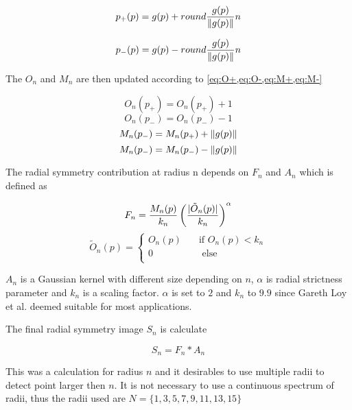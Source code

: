 \begin{equation} \label{eq:p+}
p_{+}(p) = g(p) + round\frac{g(p)}{\lVert g(p)\rVert}n
\end{equation}

\begin{equation} \label{eq:p-}
p_{-}(p) = g(p) - round\frac{g(p)}{\lVert g(p)\rVert}n
\end{equation}

The $O_n$ and $M_n$ are then updated according to \cref{eq:O+,eq:O-,eq:M+,eq:M-}

\begin{equation} \label{eq:O+}
O_{n}(p_{+}) = O_{n}(p_{+}) + 1
\end{equation}
\begin{equation} \label{eq:O-}
O_{n}(p_{-}) = O_{n}(p_{-}) - 1
\end{equation}
\begin{equation} \label{eq:M+}
M_{n}(p_{-}) = M_{n}(p_{+}) + \lVert g(p)\rVert
\end{equation}
\begin{equation} \label{eq:M-}
M_{n}(p_{-}) = M_{n}(p_{-}) - \lVert g(p)\rVert
\end{equation}

The radial symmetry contribution at radius n depends on $F_n$ and $A_n$ which is defined as 

\begin{equation} \label{eq:F}
F_n = \frac{M_{n}(p)}{k_n} \left(\frac{\lvert\tilde{O}_n(p)\rvert}{k_n}\right)^{\alpha}
\end{equation}
\begin{equation} \label{eq:A}
 \tilde{O}_n(p) =   
 \begin{cases}
 O_n(p)    & \quad \text{if } O_n(p) < k_n\\
 0		& \quad  \text{ else}\\
 \end{cases}
\end{equation}

$A_n$ is a Gaussian kernel with different size depending on $n$, $\alpha$ is radial strictness parameter and $k_n$ is a scaling factor. $\alpha$ is set to $2$ and $k_n$ to $9.9$ since Gareth Loy et al. deemed suitable for most applications.

The final radial symmetry image $S_n$ is calculate 

\begin{equation} \label{eq:M-}
S_{n} = F_n * A_n
\end{equation}

This was a calculation for radius $n$ and it desirables to use multiple radii to detect point larger then $n$. It is not necessary to use a continuous spectrum of radii, thus the radii used are $N = \{1, 3, 5, 7, 9, 11, 13, 15 \}$


